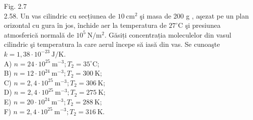 Fig. 2.7\\
2.58. Un vas cilindric cu secțiunea de $10 \mathrm{~cm}^{2}$ şi masa de 200 g , aşezat pe un plan orizontal cu gura în jos, închide aer la temperatura de $27^{\circ} \mathrm{C}$ şi presiunea atmosferică normală de $10^{5} \mathrm{~N} / \mathrm{m}^{2}$. Găsiți concentrația moleculelor din vasul cilindric şi temperatura la care aerul începe să iasă din vas. Se cunoaşte $k=1,38 \cdot 10^{-23} \mathrm{~J} / \mathrm{K}$.\\
A) $n=24 \cdot 10^{25} \mathrm{~m}^{-3} ; T_{2}=35^{\circ} \mathrm{C}$;\\
B) $n=12 \cdot 10^{24} \mathrm{~m}^{-3} ; T_{2}=300 \mathrm{~K}$;\\
C) $n=2,4 \cdot 10^{25} \mathrm{~m}^{-3} ; T_{2}=306 \mathrm{~K}$;\\
D) $n=2,4 \cdot 10^{25} \mathrm{~m}^{-3} ; T_{2}=275 \mathrm{~K}$;\\
E) $n=20 \cdot 10^{24} \mathrm{~m}^{-3} ; T_{2}=288 \mathrm{~K}$;\\
F) $n=2,4 \cdot 10^{25} \mathrm{~m}^{-3} ; T_{2}=316 \mathrm{~K}$.

